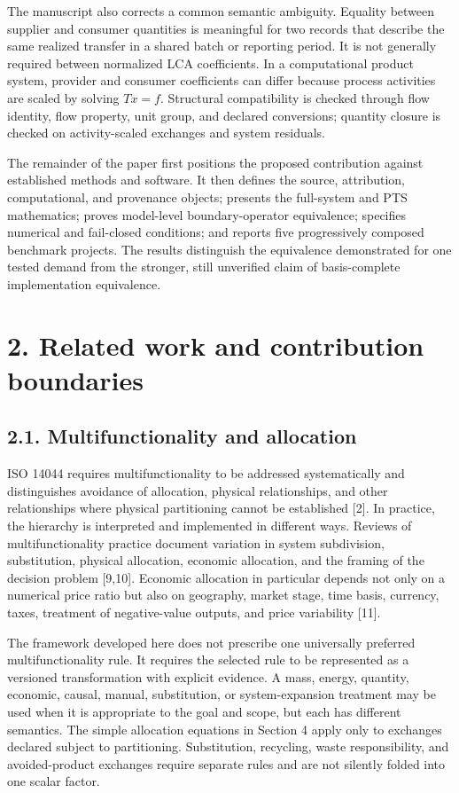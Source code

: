 \documentclass[
  10pt,
  a4paper,
  DIV=11,
  numbers=noendperiod]{scrartcl}
\begin{document}
The manuscript also corrects a common semantic ambiguity. Equality
between supplier and consumer quantities is meaningful for two records
that describe the same realized transfer in a shared batch or reporting
period. It is not generally required between normalized LCA
coefficients. In a computational product system, provider and consumer
coefficients can differ because process activities are scaled by solving
\(Tx=f\). Structural compatibility is checked through flow identity,
flow property, unit group, and declared conversions; quantity closure is
checked on activity-scaled exchanges and system residuals.

The remainder of the paper first positions the proposed contribution
against established methods and software. It then defines the source,
attribution, computational, and provenance objects; presents the
full-system and PTS mathematics; proves model-level boundary-operator
equivalence; specifies numerical and fail-closed conditions; and reports
five progressively composed benchmark projects. The results distinguish
the equivalence demonstrated for one tested demand from the stronger,
still unverified claim of basis-complete implementation equivalence.

\section{2. Related work and contribution
boundaries}\label{related-work-and-contribution-boundaries}

\subsection{2.1. Multifunctionality and
allocation}\label{multifunctionality-and-allocation}

ISO 14044 requires multifunctionality to be addressed systematically and
distinguishes avoidance of allocation, physical relationships, and other
relationships where physical partitioning cannot be established {[}2{]}.
In practice, the hierarchy is interpreted and implemented in different
ways. Reviews of multifunctionality practice document variation in
system subdivision, substitution, physical allocation, economic
allocation, and the framing of the decision problem {[}9,10{]}. Economic
allocation in particular depends not only on a numerical price ratio but
also on geography, market stage, time basis, currency, taxes, treatment
of negative-value outputs, and price variability {[}11{]}.

The framework developed here does not prescribe one universally
preferred multifunctionality rule. It requires the selected rule to be
represented as a versioned transformation with explicit evidence. A
mass, energy, quantity, economic, causal, manual, substitution, or
system-expansion treatment may be used when it is appropriate to the
goal and scope, but each has different semantics. The simple allocation
equations in Section 4 apply only to exchanges declared subject to
partitioning. Substitution, recycling, waste responsibility, and
avoided-product exchanges require separate rules and are not silently
folded into one scalar factor.
\end{document}
